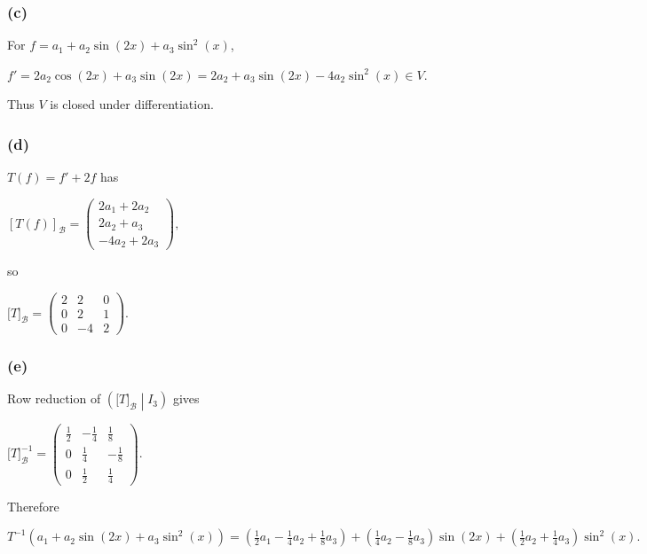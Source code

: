 \subsubsection{(c)}

For \(f = a_{1} + a_{2}\sin\left( {2x} \right) + a_{3}\sin^{2}(x)\),

\(f' = 2a_{2}\cos\left( {2x} \right) + a_{3}\sin\left( {2x} \right) = 2a_{2} + a_{3}\sin\left( {2x} \right) - 4a_{2}\sin^{2}(x) \in V.\)

Thus \(V\) is closed under differentiation.

\subsubsection{(d)}

\(T(f) = f' + 2f\) has

\(\left\lbrack {T(f)} \right\rbrack_{\mathcal{B}} = \begin{pmatrix}
{2a_{1} + 2a_{2}} \\
{2a_{2} + a_{3}} \\
{- 4a_{2} + 2a_{3}}
\end{pmatrix},\)

so

\(\lbrack T\rbrack_{\mathcal{B}} = \begin{pmatrix}
2 & 2 & 0 \\
0 & 2 & 1 \\
0 & {- 4} & 2
\end{pmatrix}.\)

\subsubsection{(e)}

Row reduction of \(\left( \lbrack T\rbrack_{\mathcal{B}} \middle| I_{3} \right)\) gives

\(\lbrack T\rbrack_{\mathcal{B}}^{- 1} = \begin{pmatrix}
\frac{1}{2} & {- \frac{1}{4}} & \frac{1}{8} \\
0 & \frac{1}{4} & {- \frac{1}{8}} \\
0 & \frac{1}{2} & \frac{1}{4}
\end{pmatrix}.\)

Therefore

\(T^{- 1}\left( {a_{1} + a_{2}\sin\left( {2x} \right) + a_{3}\sin^{2}(x)} \right) = \left( {\frac{1}{2}a_{1} - \frac{1}{4}a_{2} + \frac{1}{8}a_{3}} \right) + \left( {\frac{1}{4}a_{2} - \frac{1}{8}a_{3}} \right)\sin\left( {2x} \right) + \left( {\frac{1}{2}a_{2} + \frac{1}{4}a_{3}} \right)\sin^{2}(x).\)


